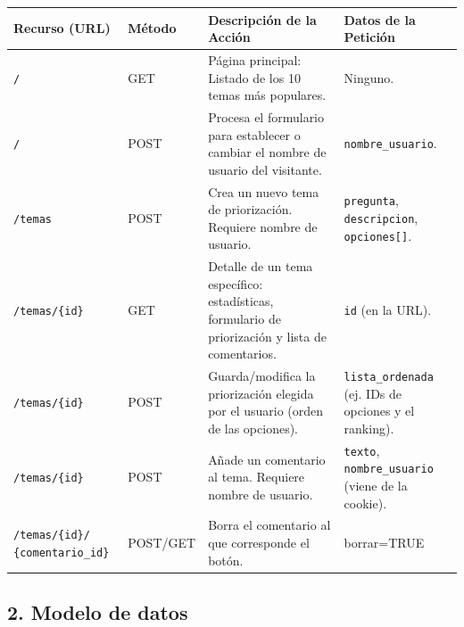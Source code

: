 \begin{table}[h!]
\centering
\renewcommand{\arraystretch}{1.5}
\begin{tabular}{|p{3.2cm}|p{1.8cm}|p{5cm}|p{4.5cm}|}
\hline
\textbf{Recurso (URL)} & \textbf{Método} & \textbf{Descripción de la Acción} & \textbf{Datos de la Petición} \\ \hline
\texttt{/} & GET & Página principal: Listado de los 10 temas más populares. & Ninguno. \\ \hline
\texttt{/} & POST & Procesa el formulario para establecer o cambiar el nombre de usuario del visitante. & \texttt{nombre\_usuario}. \\ \hline

\texttt{/temas} & POST & Crea un nuevo tema de priorización. Requiere nombre de usuario. & \texttt{pregunta}, \texttt{descripcion}, \texttt{opciones[]}. \\ \hline

\texttt{/temas/\{id\}} & GET & Detalle de un tema específico: estadísticas, formulario de priorización y lista de comentarios. & \texttt{id} (en la URL). \\ \hline
\texttt{/temas/\{id\}} & POST & Guarda/modifica la priorización elegida por el usuario (orden de las opciones). & \texttt{lista\_ordenada} (ej. IDs de opciones y el ranking). \\ \hline
\texttt{/temas/\{id\}} & POST & Añade un comentario al tema. Requiere nombre de usuario. & \texttt{texto}, \texttt{nombre\_usuario} (viene de la cookie). \\ \hline
\texttt{/temas/\{id\}/ \{comentario\_id\}} & POST/GET & Borra el comentario al que corresponde el botón. & borrar=TRUE \\ \hline
\end{tabular}
\end{table}

\subsection*{2. Modelo de datos}

